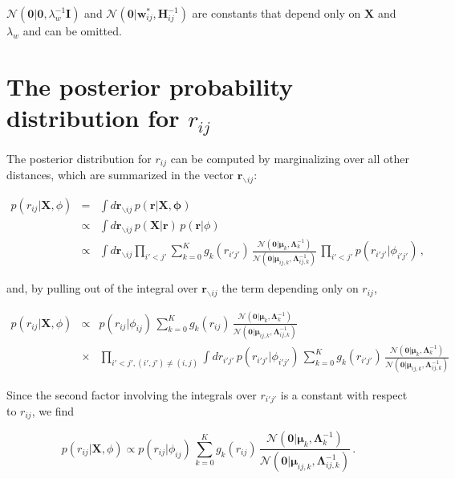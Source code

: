 \documentclass[12pt,a4paper,twoside]{book}
\newcommand{\Gauss}{\mathcal{N}}
\renewcommand{\H}{\mathbf{H}}
\newcommand{\I}{\mathbf{I}}
\newcommand{\Lijk}{\mathbf{\Lambda}_{ij,k}}
\newcommand{\Lk}{\mathbf{\Lambda}_k}
\newcommand{\muijk}{\mathbf{\mu}_{ij,k}}
\newcommand{\muk}{\mathbf{\mu}_k}
\renewcommand{\r}{\mathbf{r}}
\newcommand{\rij}{r_{ij}}
\newcommand{\wij}{\mathbf{w}_{ij}}
\newcommand{\X}{\mathbf{X}}
\theoremstyle{definition}
\theoremstyle{definition}
\theoremstyle{remark}
\begin{document}
\(\Gauss( \mathbf{0} | \mathbf{0}, \lambda_w^{-1} \I)\) and
\(\Gauss( \mathbf{0} | \wij^*, \H_{ij}^{-1})\) are constants that depend
only on \(\X\) and \(\lambda_w\) and can be omitted.

\section{\texorpdfstring{The posterior probability distribution for
\(\rij\)}{The posterior probability distribution for \textbackslash{}rij}}\label{posterior-of-rij}

The posterior distribution for \(r_{ij}\) can be computed by
marginalizing over all other distances, which are summarized in the
vector \(\r_{\backslash ij}\):

\begin{eqnarray}
    p(\rij | \X, \phi) &=& \int d \r_{\backslash ij} \, p(\r |\X, \mathbf{\phi})\\
                &\propto & \int d \r_{\backslash ij} \, p(\X|\r) \, p(\r | \phi) \\
                &\propto & \int d \r_{\backslash ij} \prod_{i'<j'} \sum_{k=0}^K g_{k}(r_{i'j'}) \, \frac{\Gauss( \mathbf{0} | \muk, \Lk^{-1})}{\Gauss(\mathbf{0} | \muijk, \Lijk^{-1})}
 \, \prod_{i'<j'} p(r_{i'j'} |\phi_{i'j'})  \,,
 \end{eqnarray}

and, by pulling out of the integral over \(\r_{\backslash ij}\) the term
depending only on \(\rij\),

\begin{eqnarray}
    p(\rij | \X, \phi) & \propto & 
            p(\rij |\phi_{ij}) \, \sum_{k=0}^K g_{k}(\rij) \, \frac{\Gauss( \mathbf{0} | \muk, \Lk^{-1})}{\Gauss(\mathbf{0} | \muijk, \Lijk^{-1})} \\
            & \times  & \prod_{i'<j', (i',j') \ne (i,j)} \int d r_{i'j'} \, p(r_{i'j'} |\phi_{i'j'}) \, \sum_{k=0}^K g_{k}(r_{i'j'}) \, \frac{\Gauss( \mathbf{0} | \muk, \Lk^{-1})}{\Gauss(\mathbf{0} | \muijk, \Lijk^{-1})}
\end{eqnarray}

Since the second factor involving the integrals over \(r_{i'j'}\) is a
constant with respect to \(\rij\), we find

\begin{equation}
    p(\rij | \X, \phi) \propto  
    p(\rij |\phi_{ij}) \,  \sum_{k=0}^K g_{k}(\rij) \, \frac{\Gauss( \mathbf{0} | \muk, \Lk^{-1})}{\Gauss(\mathbf{0} | \muijk, \Lijk^{-1})}  \, .
\label{eq:posterior-marginal-rij}
\end{equation}
\end{document}
